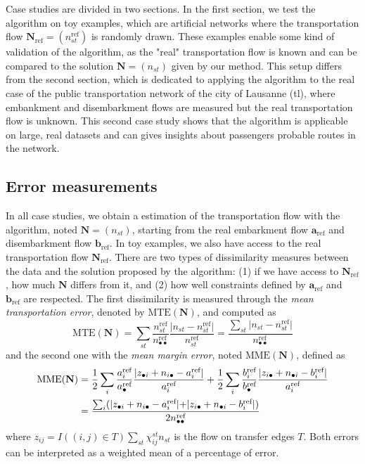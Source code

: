 \documentclass{bmcart}
\begin{document}
Case studies are divided in two sections. In the first section, we test the algorithm on toy examples, which are artificial networks where the transportation flow $\mathbf{N}_\text{ref} = (n^\text{ref}_{st})$ is randomly drawn. These examples enable some kind of validation of the algorithm, as the "real" transportation flow is known and can be compared to the solution $\mathbf{N} = (n_{st})$ given by our method. This setup differs from the second section, which is dedicated to applying the algorithm to the real case of the public transportation network of the city of Lausanne (tl), where embankment and disembarkment flows are measured but the real transportation flow is unknown. This second case study shows that the algorithm is applicable on large, real datasets and can gives insights about passengers probable routes in the network.

\subsection{Error measurements}
\label{error_measures}

In all case studies, we obtain a estimation of the transportation flow with the algorithm, noted $\mathbf{N} = (n_{st})$, starting from the real embarkment flow $\mathbf{a}_\text{ref}$ and disembarkment flow $\mathbf{b}_\text{ref}$. In toy examples, we also have access to the real transportation flow $\mathbf{N}_\text{ref}$. 
There are two types of dissimilarity measures between the data and the solution proposed by the algorithm: (1) if we have access to $\mathbf{N}_\text{ref}$, how much $\mathbf{N}$ differs from it, and (2) how well constraints defined by $\mathbf{a}_\text{ref}$ and $\mathbf{b}_\text{ref}$ are respected. The first dissimilarity is measured through the \emph{mean transportation error}, denoted by $\text{MTE}(\mathbf{N})$, and computed as
\begin{equation}
	\text{MTE}(\mathbf{N}) = \sum_{st} \frac{n^\text{ref}_{st}}{n^\text{ref}_{\bullet \bullet}} \frac{\lvert n_{st} - n^\text{ref}_{st}\lvert}{n^\text{ref}_{st}} = \frac{\sum_{st} \lvert n_{st} - n^\text{ref}_{st}\lvert}{n^\text{ref}_{\bullet \bullet}} 
	\label{MTE}
\end{equation} 
and the second one with the \emph{mean margin error}, noted $\text{MME}(\mathbf{N})$, defined as
\begin{align}
	\text{MME}(\mathbf{N}) &= \frac{1}{2} \sum_{i} \frac{a^\text{ref}_i}{a^\text{ref}_\bullet} \frac{\lvert z_{\bullet i} + n_{i \bullet} - a^\text{ref}_i \lvert}{a^\text{ref}_i} + \frac{1}{2} \sum_{i} \frac{b^\text{ref}_i}{b^\text{ref}_\bullet} \frac{\lvert z_{i \bullet} + n_{\bullet i} - b^\text{ref}_i \lvert}{a^\text{ref}_i} \notag \\
	&= \frac{\sum_i (\lvert z_{\bullet i} + n_{i \bullet} - a^\text{ref}_i \lvert + \lvert z_{i \bullet} + n_{\bullet i} - b^\text{ref}_i \lvert)}{2n^\text{ref}_{\bullet \bullet}}
	\label{MME}
\end{align} 
where $z_{ij} = I((i,j) \in T)\sum_{st} \chi_{ij}^{st} n_{st}$ is the flow on transfer edges $T$. Both errors can be interpreted as a weighted mean of a percentage of error.
\end{document}
